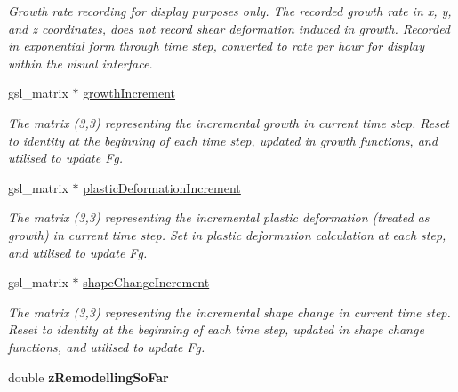 \begin{DoxyCompactItemize}
\begin{DoxyCompactList}\small\item\em Growth rate recording for display purposes only. The recorded growth rate in x, y, and z coordinates, does not record shear deformation induced in growth. Recorded in exponential form through time step, converted to rate per hour for display within the visual interface. \end{DoxyCompactList}\item 
\hypertarget{classShapeBase_af553856335d7344ea67ab10f9cc3babf}{}gsl\+\_\+matrix $\ast$ \hyperlink{classShapeBase_af553856335d7344ea67ab10f9cc3babf}{growth\+Increment}\label{classShapeBase_af553856335d7344ea67ab10f9cc3babf}

\begin{DoxyCompactList}\small\item\em The matrix (3,3) representing the incremental growth in current time step. Reset to identity at the beginning of each time step, updated in growth functions, and utilised to update Fg. \end{DoxyCompactList}\item 
\hypertarget{classShapeBase_ab61c4a1f4132f54c362ea6296389abf6}{}gsl\+\_\+matrix $\ast$ \hyperlink{classShapeBase_ab61c4a1f4132f54c362ea6296389abf6}{plastic\+Deformation\+Increment}\label{classShapeBase_ab61c4a1f4132f54c362ea6296389abf6}

\begin{DoxyCompactList}\small\item\em The matrix (3,3) representing the incremental plastic deformation (treated as growth) in current time step. Set in plastic deformation calculation at each step, and utilised to update Fg. \end{DoxyCompactList}\item 
\hypertarget{classShapeBase_a2db4859942429aa4e3efc26a119a5aa3}{}gsl\+\_\+matrix $\ast$ \hyperlink{classShapeBase_a2db4859942429aa4e3efc26a119a5aa3}{shape\+Change\+Increment}\label{classShapeBase_a2db4859942429aa4e3efc26a119a5aa3}

\begin{DoxyCompactList}\small\item\em The matrix (3,3) representing the incremental shape change in current time step. Reset to identity at the beginning of each time step, updated in shape change functions, and utilised to update Fg. \end{DoxyCompactList}\item 
\hypertarget{classShapeBase_a0dc566eb70e64da9fc3fa222b16999da}{}double {\bfseries z\+Remodelling\+So\+Far}\label{classShapeBase_a0dc566eb70e64da9fc3fa222b16999da}


\end{DoxyCompactItemize}
